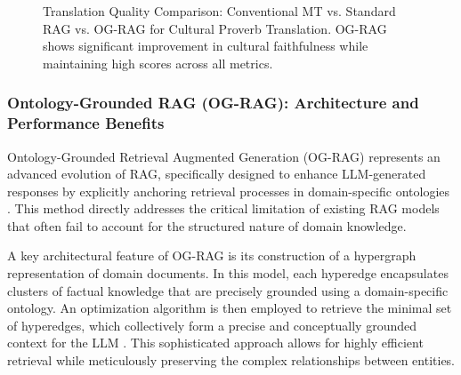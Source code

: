 \documentclass[12pt]{article}
\let\cite\textcite  %
\begin{document}
\begin{figure}[htbp]
  \centering
\caption{Translation Quality Comparison: Conventional MT vs. Standard RAG vs. OG-RAG for Cultural Proverb Translation. OG-RAG shows significant improvement in cultural faithfulness while maintaining high scores across all metrics.}
\label{fig:translation_quality_comparison}
\end{figure}

\subsubsection{Ontology-Grounded RAG (OG-RAG): Architecture and Performance Benefits}

Ontology-Grounded Retrieval Augmented Generation (OG-RAG) represents an advanced evolution of RAG, specifically designed to enhance LLM-generated responses by explicitly anchoring retrieval processes in domain-specific ontologies \cite{chen2024og, chen2024integrating, chen2024integrating}. This method directly addresses the critical limitation of existing RAG models that often fail to account for the structured nature of domain knowledge.

A key architectural feature of OG-RAG is its construction of a hypergraph representation of domain documents. In this model, each hyperedge encapsulates clusters of factual knowledge that are precisely grounded using a domain-specific ontology. An optimization algorithm is then employed to retrieve the minimal set of hyperedges, which collectively form a precise and conceptually grounded context for the LLM \cite{chen2024og, chen2024integrating}. This sophisticated approach allows for highly efficient retrieval while meticulously preserving the complex relationships between entities.
\end{document}
